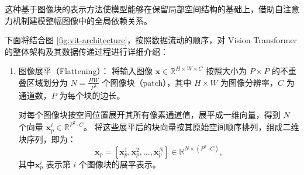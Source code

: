 这种基于图像块的表示方法使模型能够在保留局部空间结构的基础上，借助自注意力机制建模整幅图像中的全局依赖关系。

下面将结合图 \ref{fig:vit-architecture}，按照数据流动的顺序，对 Vision Transformer 的整体架构及其数据传递过程进行详细介绍：
\begin{enumerate}[label={（\arabic*）}, leftmargin=2em, labelsep=0.5em, itemsep=0pt]
\item 图像展平（Flattening）：
将输入图像 $\boldsymbol{x} \in \mathbb{R}^{H \times W \times C}$ 按照大小为 $P \times P$ 的不重叠区域划分为 $N = \frac{HW}{P^2}$ 个图像块（patch），其中 $H \times W$ 为图像分辨率，$C$ 为通道数，$P$ 为每个块的边长。

对每个图像块按空间位置展开其所有像素通道值，展平成一维向量，得到 $N$ 个向量 $\boldsymbol{x}_p^i \in \mathbb{R}^{P^2 \cdot C}$。
将这些展平后的块向量按其原始空间顺序排列，组成二维块序列，即为：
\[
\boldsymbol{x}_{p} = [\boldsymbol{x}_p^1, \boldsymbol{x}_p^2, \ldots, \boldsymbol{x}_p^N] \in \mathbb{R}^{N \times (P^2 \cdot C)},
\]
其中$\boldsymbol{x}_p^i$ 表示第 $i$ 个图像块的展平表示。


\end{enumerate}

